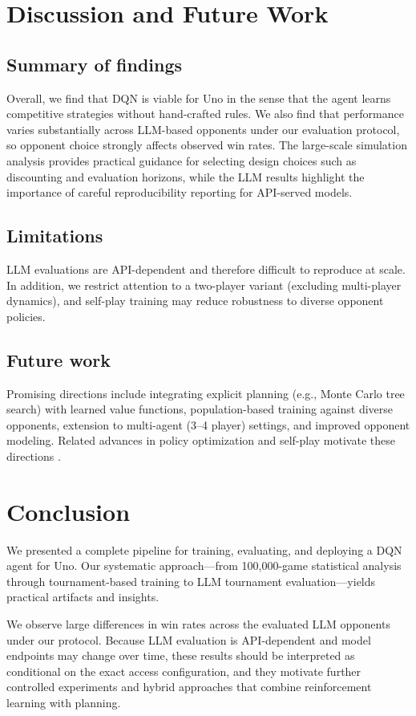 \documentclass[11pt]{article}
\begin{document}
\FloatBarrier
\section{Discussion and Future Work}
\subsection{Summary of findings}
Overall, we find that DQN is viable for Uno in the sense that the agent learns competitive strategies without hand-crafted rules. We also find that performance varies substantially across LLM-based opponents under our evaluation protocol, so opponent choice strongly affects observed win rates. The large-scale simulation analysis provides practical guidance for selecting design choices such as discounting and evaluation horizons, while the LLM results highlight the importance of careful reproducibility reporting for API-served models.

\subsection{Limitations}
LLM evaluations are API-dependent and therefore difficult to reproduce at scale. In addition, we restrict attention to a two-player variant (excluding multi-player dynamics), and self-play training may reduce robustness to diverse opponent policies.

\subsection{Future work}
Promising directions include integrating explicit planning (e.g., Monte Carlo tree search) with learned value functions, population-based training against diverse opponents, extension to multi-agent (3--4 player) settings, and improved opponent modeling. Related advances in policy optimization and self-play motivate these directions \parencite{schulman2017ppo,silver2017mastering}.

\section{Conclusion}
We presented a complete pipeline for training, evaluating, and deploying a DQN agent for Uno. Our systematic approach---from 100{,}000-game statistical analysis through tournament-based training to LLM tournament evaluation---yields practical artifacts and insights.

We observe large differences in win rates across the evaluated LLM opponents under our protocol. Because LLM evaluation is API-dependent and model endpoints may change over time, these results should be interpreted as conditional on the exact access configuration, and they motivate further controlled experiments and hybrid approaches that combine reinforcement learning with planning.
\end{document}
